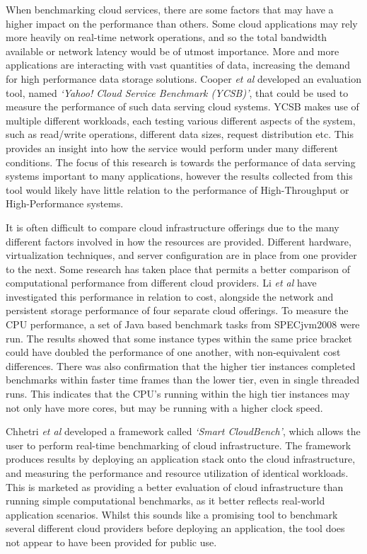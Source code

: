 \documentclass{entcs} \usepackage{entcsmacro}
\begin{document}
When benchmarking cloud services, there are some factors that may have a higher impact on the performance than others. Some cloud applications may rely more heavily on real-time network operations, and so the total bandwidth available or network latency would be of utmost importance. More and more applications are interacting with vast quantities of data, increasing the demand for high performance data storage solutions. Cooper \textit{et al}\cite{cooper2010benchmarking} developed an evaluation tool, named \textit{`Yahoo! Cloud Service Benchmark (YCSB)'}, that could be used to measure the performance of such data serving cloud systems. YCSB makes use of multiple different workloads, each testing various different aspects of the system, such as read/write operations, different data sizes, request distribution etc. This provides an insight into how the service would perform under many different conditions. The focus of this research is towards the performance of data serving systems important to many applications, however the results collected from this tool would likely have little relation to the performance of High-Throughput or High-Performance systems.

It is often difficult to compare cloud infrastructure offerings due to the many different factors involved in how the resources are provided. Different hardware, virtualization techniques, and server configuration are in place from one provider to the next\cite{chhetri2013smart}. Some research has taken place that permits a better comparison of computational performance from different cloud providers. Li \textit{et al}\cite{li2010cloudcmp} have investigated this performance in relation to cost, alongside the network and persistent storage performance of four separate cloud offerings. To measure the CPU performance, a set of Java based benchmark tasks from SPECjvm2008 were run. The results showed that some instance types within the same price bracket could have doubled the performance of one another, with non-equivalent cost differences. There was also confirmation that the higher tier instances completed benchmarks within faster time frames than the lower tier, even in single threaded runs. This indicates that the CPU's running within the high tier instances may not only have more cores, but may be running with a higher clock speed.

Chhetri \textit{et al}\cite{chhetri2013smart} developed a framework called \textit{`Smart CloudBench'}, which allows the user to perform real-time benchmarking of cloud infrastructure. The framework produces results by deploying an application stack onto the cloud infrastructure, and measuring the performance and resource utilization of identical workloads. This is marketed as providing a better evaluation of cloud infrastructure than running simple computational benchmarks, as it better reflects real-world application scenarios. Whilst this sounds like a promising tool to benchmark several different cloud providers before deploying an application, the tool does not appear to have been provided for public use.
\end{document}
